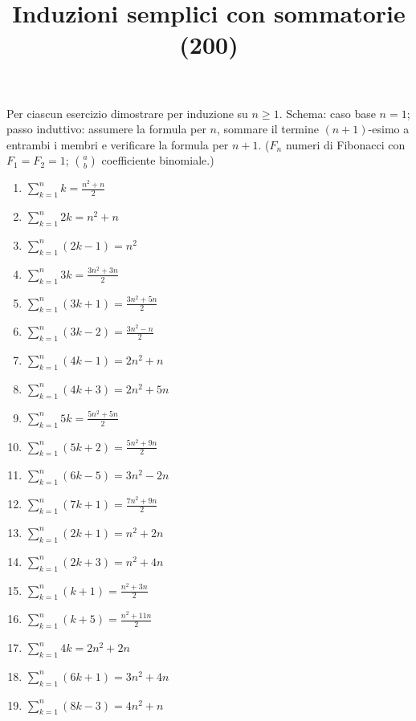 \documentclass[11pt,a4paper]{article}
\title{Induzioni semplici con sommatorie (200)}
\author{}
\date{}
\begin{document}
\maketitle
Per ciascun esercizio dimostrare per induzione su $n\ge1$. Schema: caso base $n=1$; passo induttivo: assumere la formula per $n$, sommare il termine $(n+1)$-esimo a entrambi i membri e verificare la formula per $n+1$. ($F_n$ numeri di Fibonacci con $F_1=F_2=1$; $\binom{a}{b}$ coefficiente binomiale.)

\begin{enumerate}
\item $\displaystyle \sum_{k=1}^{n} k = \frac{n^{2} + n}{2}$
\item $\displaystyle \sum_{k=1}^{n} 2k = n^{2} + n$
\item $\displaystyle \sum_{k=1}^{n} \left(2k - 1\right) = n^{2}$
\item $\displaystyle \sum_{k=1}^{n} 3k = \frac{3n^{2} + 3n}{2}$
\item $\displaystyle \sum_{k=1}^{n} \left(3k + 1\right) = \frac{3n^{2} + 5n}{2}$
\item $\displaystyle \sum_{k=1}^{n} \left(3k - 2\right) = \frac{3n^{2} - n}{2}$
\item $\displaystyle \sum_{k=1}^{n} \left(4k - 1\right) = 2n^{2} + n$
\item $\displaystyle \sum_{k=1}^{n} \left(4k + 3\right) = 2n^{2} + 5n$
\item $\displaystyle \sum_{k=1}^{n} 5k = \frac{5n^{2} + 5n}{2}$
\item $\displaystyle \sum_{k=1}^{n} \left(5k + 2\right) = \frac{5n^{2} + 9n}{2}$
\item $\displaystyle \sum_{k=1}^{n} \left(6k - 5\right) = 3n^{2} - 2n$
\item $\displaystyle \sum_{k=1}^{n} \left(7k + 1\right) = \frac{7n^{2} + 9n}{2}$
\item $\displaystyle \sum_{k=1}^{n} \left(2k + 1\right) = n^{2} + 2n$
\item $\displaystyle \sum_{k=1}^{n} \left(2k + 3\right) = n^{2} + 4n$
\item $\displaystyle \sum_{k=1}^{n} \left(k + 1\right) = \frac{n^{2} + 3n}{2}$
\item $\displaystyle \sum_{k=1}^{n} \left(k + 5\right) = \frac{n^{2} + 11n}{2}$
\item $\displaystyle \sum_{k=1}^{n} 4k = 2n^{2} + 2n$
\item $\displaystyle \sum_{k=1}^{n} \left(6k + 1\right) = 3n^{2} + 4n$
\item $\displaystyle \sum_{k=1}^{n} \left(8k - 3\right) = 4n^{2} + n$

\end{enumerate}
\end{document}

